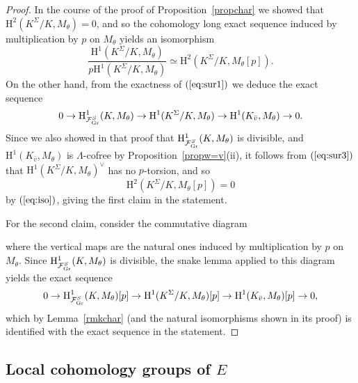 \documentclass[10pt]{amsart}
\numberwithin{equation}{section}
\theoremstyle{definition}
\theoremstyle{remark}
\newcommand{\Fcal}{\mathcal{F}}
\newcommand{\rH}{\mathrm{H}}
\begin{document}
\begin{proof} 
In the course of the proof of Proposition~\ref{propchar} we showed that $\rH^2(K^\Sigma/K,M_\theta)=0$, and so the cohomology long exact sequence induced by multiplication by $p$ on $M_\theta$ yields an isomorphism
\begin{equation}\label{eq:iso}
\frac{\rH^1(K^\Sigma/K,M_\theta)}{p\rH^1(K^\Sigma/K,M_\theta)}\simeq\rH^2(K^\Sigma/K,M_\theta[p]).
\end{equation}
On the other hand, from the exactness of $(\ref{eq:sur1})$  we deduce the exact sequence
\begin{equation}\label{eq:sur3}
0\rightarrow\rH^1_{\Fcal_{\rm Gr}^S}(K,M_\theta)\rightarrow\rH^1(K^\Sigma/K,M_\theta)\rightarrow\rH^1(K_{\bar{v}},M_\theta)\rightarrow 0.
\end{equation}
Since we also showed in that proof that $\rH^1_{\Fcal_{\rm Gr}^S}(K,M_\theta)$ is divisible, and $\rH^1(K_{\bar{v}},M_\theta)$ is $\Lambda$-cofree by Proposition~\ref{propw=v}(ii), it follows from $(\ref{eq:sur3})$ that $\rH^1(K^\Sigma/K,M_\theta)^\vee$ has no $p$-torsion, and so 
\[
\rH^2(K^\Sigma/K,M_\theta[p])=0
\] 
by $(\ref{eq:iso})$, giving the first claim in the statement.

For the second claim, consider the commutative diagram
\begin{center}
\end{center}
where the vertical maps are the natural ones induced by multiplication by $p$ on $M_\theta$. Since $\rH^1_{\Fcal_{\rm Gr}^S}(K,M_\theta)$ is divisible, the snake lemma applied to this diagram yields the exact sequence
\[
0\rightarrow\rH^1_{\Fcal_{\rm Gr}^S}(K,M_\theta)[p]\rightarrow\rH^1(K^\Sigma/K,M_\theta)[p]\rightarrow\rH^1(K_{\bar{v}},M_\theta)[p]\rightarrow 0,
\]
which by Lemma~\ref{rmkchar} (and the natural isomorphisms shown in its proof) is identified with the exact sequence in the statement.
\end{proof}


\subsection{Local cohomology groups of \texorpdfstring{$E$}{E}}
\label{subsec:local-E}
\end{document}
